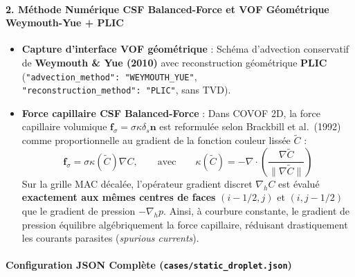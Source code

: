 \documentclass[
  10pt,
]{article}
\providecommand{\tightlist}{%
  \setlength{\itemsep}{0pt}\setlength{\parskip}{0pt}}
\begin{document}
\paragraph{2. Méthode Numérique CSF Balanced-Force et VOF Géométrique
Weymouth-Yue +
PLIC}\label{muxe9thode-numuxe9rique-csf-balanced-force-et-vof-guxe9omuxe9trique-weymouth-yue-plic}

\begin{itemize}
\tightlist
\item
  \textbf{Capture d'interface VOF géométrique} : Schéma d'advection
  conservatif de \textbf{Weymouth \& Yue (2010)} avec reconstruction
  géométrique \textbf{PLIC}
  (\texttt{"advection\_method":\ "WEYMOUTH\_YUE"},
  \texttt{"reconstruction\_method":\ "PLIC"}, sans TVD).
\item
  \textbf{Force capillaire CSF Balanced-Force} : Dans COVOF 2D, la force
  capillaire volumique
  \(\mathbf{f}_\sigma = \sigma \kappa \delta_s \mathbf{n}\) est
  reformulée selon Brackbill et al.~(1992) comme proportionnelle au
  gradient de la fonction couleur lissée \(\tilde{C}\) :
  \[\mathbf{f}_\sigma = \sigma \kappa(\tilde{C}) \nabla C, \qquad \text{avec} \qquad \kappa(\tilde{C}) = -\nabla \cdot \left( \frac{\nabla \tilde{C}}{\|\nabla \tilde{C}\|} \right)\]
  Sur la grille MAC décalée, l'opérateur gradient discret \(\nabla_h C\)
  est évalué \textbf{exactement aux mêmes centres de faces}
  \((i-1/2, j)\) et \((i, j-1/2)\) que le gradient de pression
  \(-\nabla_h p\). Ainsi, à courbure constante, le gradient de pression
  équilibre algébriquement la force capillaire, réduisant drastiquement
  les courants parasites (\emph{spurious currents}).
\end{itemize}

\paragraph{\texorpdfstring{Configuration JSON Complète
(\texttt{cases/static\_droplet.json})}{Configuration JSON Complète (cases/static\_droplet.json)}}\label{configuration-json-compluxe8te-casesstatic_droplet.json}
\end{document}
